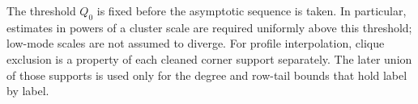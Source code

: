 The threshold \(Q_0\) is fixed before the asymptotic sequence is taken. In particular, estimates in powers of a cluster scale are required uniformly above this threshold; low-mode scales are not assumed to diverge. For profile interpolation, clique exclusion is a property of each cleaned corner support separately. The later union of those supports is used only for the degree and row-tail bounds that hold label by label.

